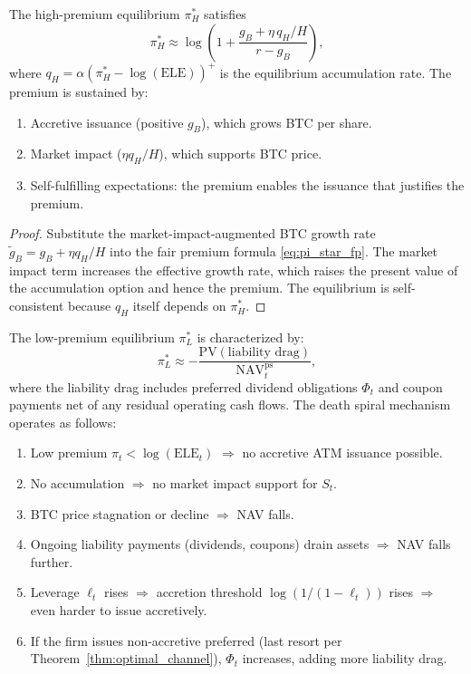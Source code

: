 \begin{proposition}\label{prop:high_eq}
The high-premium equilibrium $\pi_H^*$ satisfies
\begin{equation}\label{eq:pi_H}
  \pi_H^* \approx \log\!\left(1 + \frac{g_B + \eta\, q_H / H}{r - g_B}
  \right),
\end{equation}
where $q_H = \alpha(\pi_H^* - \log(\mathrm{ELE}))^+$ is the equilibrium
accumulation rate.  The premium is sustained by:
\begin{enumerate}
  \item Accretive issuance (positive $g_B$), which grows BTC per share.
  \item Market impact ($\eta q_H / H$), which supports BTC price.
  \item Self-fulfilling expectations: the premium enables the issuance
    that justifies the premium.
\end{enumerate}
\end{proposition}

\begin{proof}
Substitute the market-impact-augmented BTC growth rate $\tilde{g}_B =
g_B + \eta q_H / H$ into the fair premium formula
\eqref{eq:pi_star_fp}.  The market impact term increases the effective
growth rate, which raises the present value of the accumulation option and
hence the premium.  The equilibrium is self-consistent because $q_H$ itself
depends on $\pi_H^*$.
\end{proof}

\begin{proposition}\label{prop:death_spiral}
The low-premium equilibrium $\pi_L^*$ is characterized by:
\begin{equation}\label{eq:pi_L}
  \pi_L^* \approx -\frac{\mathrm{PV}(\text{liability drag})}
  {\mathrm{NAV}_t^{\mathrm{ps}}},
\end{equation}
where the liability drag includes preferred dividend obligations $\Phi_t$
and coupon payments net of any residual operating cash flows.  The death
spiral mechanism operates as follows:
\begin{enumerate}
  \item Low premium $\pi_t < \log(\mathrm{ELE}_t)$ $\Rightarrow$
    no accretive ATM issuance possible.
  \item No accumulation $\Rightarrow$ no market impact support for $S_t$.
  \item BTC price stagnation or decline $\Rightarrow$ NAV falls.
  \item Ongoing liability payments (dividends, coupons) drain assets
    $\Rightarrow$ NAV falls further.
  \item Leverage $\ell_t$ rises $\Rightarrow$ accretion threshold
    $\log(1/(1-\ell_t))$ rises $\Rightarrow$ even harder to issue
    accretively.
  \item If the firm issues non-accretive preferred (last resort per
    Theorem~\ref{thm:optimal_channel}), $\Phi_t$ increases, adding
    more liability drag.
\end{enumerate}
\end{proposition}

